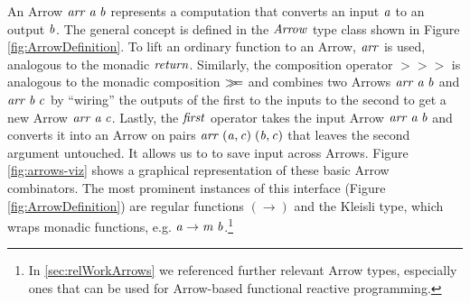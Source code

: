 \documentclass[paper=A4,twoside=true,openright,parskip=full,chapterprefix=true,headings=normal,bibliography=totoc,listof=totoc,titlepage=on,captions=tableabove,draft=false,british]{scrreprt}%
\renewcommand{\enquote}[1]{{``}#1{''}}
\begin{document}
An Arrow \ensuremath{\Varid{arr}\;\Varid{a}\;\Varid{b}} represents a computation that converts an input \ensuremath{\Varid{a}}
to an output \ensuremath{\Varid{b}}. The general concept is defined in the \ensuremath{\Conid{Arrow}} type
class shown in Figure \ref{fig:ArrowDefinition}. To lift an ordinary
function to an Arrow, \ensuremath{\Varid{arr}} is used, analogous to the monadic \ensuremath{\Varid{return}}.
Similarly, the composition operator \ensuremath{\mathbin{>\!\!>\!\!>}} is analogous to the monadic
composition \ensuremath{\bind } and combines two Arrows \ensuremath{\Varid{arr}\;\Varid{a}\;\Varid{b}} and \ensuremath{\Varid{arr}\;\Varid{b}\;\Varid{c}} by
\enquote{wiring} the outputs of the first to the inputs to the second to
get a new Arrow \ensuremath{\Varid{arr}\;\Varid{a}\;\Varid{c}}. Lastly, the \ensuremath{\Varid{first}} operator takes the input
Arrow \ensuremath{\Varid{arr}\;\Varid{a}\;\Varid{b}} and converts it into an Arrow on pairs
\ensuremath{\Varid{arr}\;(\Varid{a},\Varid{c})\;(\Varid{b},\Varid{c})} that leaves the second argument untouched. It allows
us to to save input across Arrows. Figure \ref{fig:arrows-viz} shows a
graphical representation of these basic Arrow combinators. The most
prominent instances of this interface (Figure \ref{fig:ArrowDefinition})
are regular functions \ensuremath{(\to )} and the Kleisli type, which wraps monadic
functions, e.g. \ensuremath{\Varid{a}\to \Varid{m}\;\Varid{b}}.\footnote{In \ref{sec:relWorkArrows} we
  referenced further relevant Arrow types, especially ones that can be
  used for Arrow-based functional reactive programming.}
\end{document}
